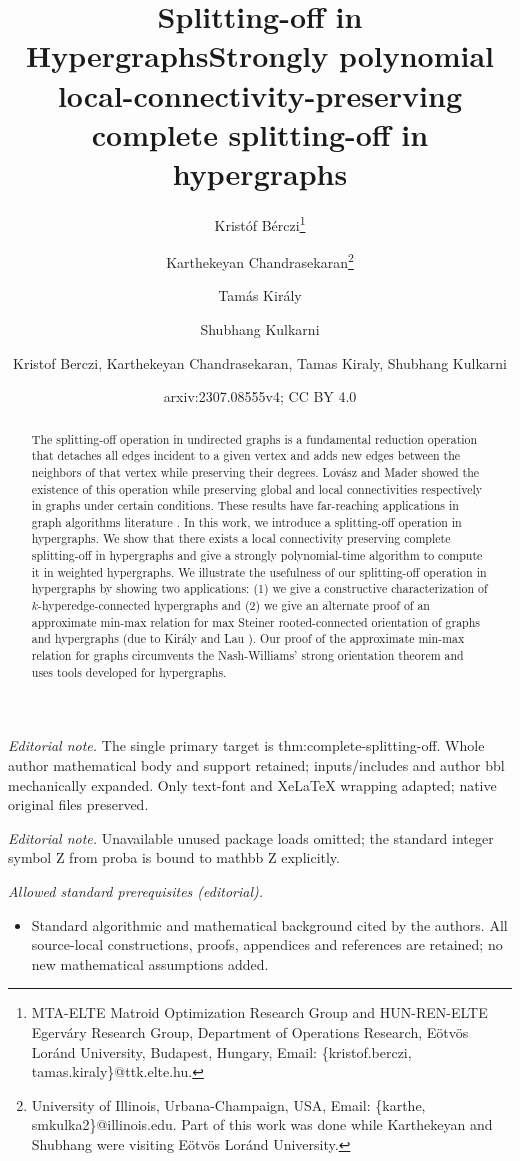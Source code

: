 \documentclass{article}
\title{Splitting-off in Hypergraphs}
\author{
Krist\'{o}f B\'{e}rczi\thanks{MTA-ELTE Matroid Optimization Research Group and HUN-REN-ELTE Egerv\'{a}ry Research Group, Department of Operations Research, E\"{o}tv\"{o}s Lor\'{a}nd
University, Budapest, Hungary, Email: \{kristof.berczi, tamas.kiraly\}@ttk.elte.hu.}
\and Karthekeyan Chandrasekaran\thanks{University of Illinois, Urbana-Champaign, USA, Email: \{karthe, smkulka2\}@illinois.edu. 
Part of this work was done while Karthekeyan and Shubhang were visiting E\"{o}tv\"{o}s Lor\'{a}nd
University.}
\and Tam\'{a}s Kir\'{a}ly\footnotemark[1]
\and Shubhang Kulkarni\footnotemark[2]
}
\date{}
\title{Strongly polynomial local-connectivity-preserving complete splitting-off in hypergraphs}
\author{Kristof Berczi, Karthekeyan Chandrasekaran, Tamas Kiraly, Shubhang Kulkarni}
\date{arxiv:2307.08555v4; CC BY 4.0}
\begin{document}
\maketitle
\noindent\textit{Editorial note.} The single primary target is thm:complete-splitting-off. Whole author mathematical body and support retained; inputs/includes and author bbl mechanically expanded. Only text-font and XeLaTeX wrapping adapted; native original files preserved.\par\medskip
\noindent\textit{Editorial note.} Unavailable unused package loads omitted; the standard integer symbol Z from proba is bound to mathbb Z explicitly.\par\medskip
\noindent\textit{Allowed standard prerequisites (editorial).}\begin{itemize}
\item Standard algorithmic and mathematical background cited by the authors. All source-local constructions, proofs, appendices and references are retained; no new mathematical assumptions added.
\end{itemize}\medskip
\begin{abstract}
The splitting-off operation in undirected graphs is a fundamental reduction operation that detaches all edges incident to a given vertex and adds new edges between the neighbors of that vertex while preserving their degrees. Lov\'{a}sz \cite{Lov74, Lovasz-problems-book} and Mader \cite{Mad78} showed the existence of this operation while preserving global and local connectivities respectively in graphs under certain conditions. These results have far-reaching applications in graph algorithms literature \cite{Lov76, Mad78, Frank93:Applications-of-submod-functions, FK02, Kiraly-Lau, Fra92, GB93, Fra94, JFJ95, Frank-book, nagamochi_ibaraki_2008_book, NNI97, HW96, Goe01, Jor03, Kri03, JMS03, CFLY11, BHTP03, Lau07, CS08, NZ20, BN23}. 
In this work, we introduce a splitting-off operation in hypergraphs. We show that there exists a local connectivity preserving complete splitting-off in hypergraphs and give a strongly polynomial-time algorithm to compute it in weighted hypergraphs. We illustrate the usefulness of our splitting-off operation in hypergraphs by showing two applications: (1) we give a constructive characterization of $k$-hyperedge-connected hypergraphs and (2) we give an alternate proof of an approximate min-max relation for max Steiner rooted-connected orientation of graphs and hypergraphs (due to Kir\'{a}ly and Lau \cite{Kiraly-Lau}). Our proof of the approximate min-max relation for graphs circumvents the Nash-Williams' strong orientation theorem and uses tools developed for hypergraphs.
\end{abstract}
\end{document}

